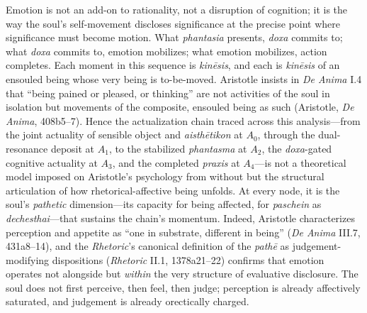 \documentclass{article}
\begin{document}
Emotion is not an add-on to rationality, not a disruption of cognition; it is the way the soul's self-movement discloses significance at the precise point where significance must become motion. What \textit{phantasia} presents, \textit{doxa} commits to; what \textit{doxa} commits to, emotion mobilizes; what emotion mobilizes, action completes. Each moment in this sequence is \textit{kinēsis}, and each is \textit{kinēsis} of an ensouled being whose very being is to-be-moved. Aristotle insists in \textit{De Anima} I.4 that ``being pained or pleased, or thinking'' are not activities of the soul in isolation but movements of the composite, ensouled being as such (Aristotle, \textit{De Anima}, 408b5--7). Hence the actualization chain traced across this analysis---from the joint actuality of sensible object and \textit{aisthētikon} at $A_0$, through the dual-resonance deposit at $A_1$, to the stabilized \textit{phantasma} at $A_2$, the \textit{doxa}-gated cognitive actuality at $A_3$, and the completed \textit{praxis} at $A_4$---is not a theoretical model imposed on Aristotle's psychology from without but the structural articulation of how rhetorical-affective being unfolds. At every node, it is the soul's \textit{pathetic} dimension---its capacity for being affected, for \textit{paschein} as \textit{dechesthai}---that sustains the chain's momentum. Indeed, Aristotle characterizes perception and appetite as ``one in substrate, different in being'' (\textit{De Anima} III.7, 431a8--14), and the \textit{Rhetoric}'s canonical definition of the \textit{pathē} as judgement-modifying dispositions (\textit{Rhetoric} II.1, 1378a21--22) confirms that emotion operates not alongside but \textit{within} the very structure of evaluative disclosure. The soul does not first perceive, then feel, then judge; perception is already affectively saturated, and judgement is already orectically charged.
\end{document}
